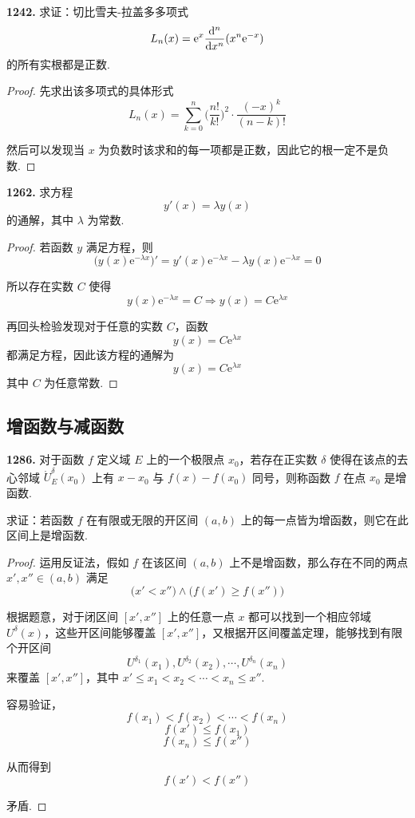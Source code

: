 \textbf{1242.} 求证：切比雪夫-拉盖多多项式
\[L_n(x) = \mathrm{e}^x \frac{\mathop{}\!\mathrm{d}^n}{\mathop{}\!\mathrm{d} x^n}(x^n \mathrm{e}^{-x})\]
的所有实根都是正数.

\begin{proof}
    先求出该多项式的具体形式
    \[L_n(x) = \sum_{k=0}^{n} \biggl(\frac{n!}{k!}\biggr)^2 \cdot \frac{(-x)^k}{(n-k)!}\]

    然后可以发现当 $x$ 为负数时该求和的每一项都是正数，因此它的根一定不是负数.
\end{proof}

\textbf{1262.} 求方程
\[y'(x) = \lambda y(x)\]
的通解，其中 $\lambda$ 为常数.

\begin{proof}
    若函数 $y$ 满足方程，则
    \[\bigl(y(x) \mathrm{e}^{-\lambda x}\bigr)' = y'(x) \mathrm{e}^{-\lambda x} - \lambda y(x) \mathrm{e}^{-\lambda x} = 0\]

    所以存在实数 $C$ 使得
    \[y(x) \mathrm{e}^{-\lambda x} = C \Rightarrow y(x) = C \mathrm{e}^{\lambda x}\]

    再回头检验发现对于任意的实数 $C$，函数
    \[y(x) = C \mathrm{e}^{\lambda x}\]
    都满足方程，因此该方程的通解为
    \[y(x) = C \mathrm{e}^{\lambda x}\]
    其中 $C$ 为任意常数.
\end{proof}

\subsection{增函数与减函数}
\textbf{1286.} 对于函数 $f$ 定义域 $E$ 上的一个极限点 $x_0$，若存在正实数 $\delta$ 使得在该点的去心邻域 $\mathring{U}^\delta_E(x_0)$ 上有 $x - x_0$ 与 $f(x) - f(x_0)$ 同号，则称函数 $f$ 在点 $x_0$ 是增函数.

求证：若函数 $f$ 在有限或无限的开区间 $(a,b)$ 上的每一点皆为增函数，则它在此区间上是增函数.

\begin{proof}
    运用反证法，假如 $f$ 在该区间 $(a,b)$ 上不是增函数，那么存在不同的两点 $x', x'' \in (a,b)$ 满足
    \[\bigl(x' < x''\bigr) \wedge \bigl(f(x') \geqslant f(x'')\bigr)\]

    根据题意，对于闭区间 $[x', x'']$ 上的任意一点 $x$ 都可以找到一个相应邻域 $U^\delta(x)$，这些开区间能够覆盖 $[x', x'']$，又根据开区间覆盖定理，能够找到有限个开区间
    \[U^{\delta_1}(x_1), U^{\delta_2}(x_2), \cdots, U^{\delta_n}(x_n)\]
    来覆盖 $[x', x'']$，其中 $x' \leqslant x_1 < x_2 < \cdots < x_n \leqslant x''$.

    容易验证，
    \[f(x_1) < f(x_2) < \cdots < f(x_n)\]
    \[f(x') \leqslant f(x_1)\]
    \[f(x_n) \leqslant f(x'')\]

    从而得到
    \[f(x') < f(x'')\]

    矛盾.
\end{proof}

